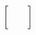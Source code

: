\documentclass[preview]{standalone}
\begin{document}
\begin{align*}
\centering \left[\begin{array}{c}\quad \\\quad \\\end{array}\right]
\end{align*}
\end{document}
